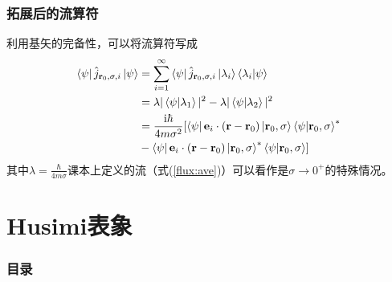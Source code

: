 \documentclass[UTF8]{beamer}
\begin{document}
\begin{frame}
    \frametitle{拓展后的流算符}
    利用基矢的完备性，可以将流算符写成
    \begin{align}
        \bra{\psi}\hat{j}_{\mathbf{r}_0,\sigma,i}\ket{\psi} & =\sum_{i=1}^\infty
        \bra{\psi}\hat{j}_{\mathbf{r}_0,\sigma,i}\ket{\lambda_i}\braket{\lambda_i|\psi}                                                                                                                                       \\
                                                            & =\lambda | \braket{\psi|\lambda_1}|^2-\lambda|\braket{\psi|\lambda_2}|^2                                                                                        \\
                                                            & =\frac{\mathrm{i}\hbar}{4m\sigma^2}[\bra{\psi}\mathbf{e}_i\cdot(\mathbf{r}-\mathbf{r}_0)\ket{\mathbf{r}_0,\sigma}\braket{\psi|\mathbf{r}_0,\sigma}^{*}\nonumber
        \\&-\bra{\psi}\mathbf{e}_i\cdot(\mathbf{r}-\mathbf{r}_0)\ket{\mathbf{r}_0,\sigma}^{*}\braket{\psi|\mathbf{r}_0,\sigma}]
    \end{align}
    其中$\lambda=\frac{\hbar}{4m\sigma}$课本上定义的流（式(\ref{flux:ave})）可以看作是$\sigma\rightarrow0^{+}$的特殊情况。
\end{frame}
%
\section{Husimi表象}
\begin{frame}\frametitle{目录}
    \tableofcontents[currentsection]
\end{frame}
\end{document}
